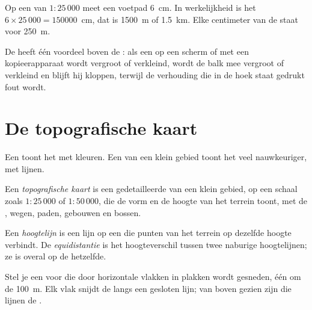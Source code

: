 \begin{example}
Op een  van $1 : 25\,000$ meet een voetpad \qty{6}{cm}. In
werkelijkheid is het $6 \times 25\,000 = \num{150000}$~cm, dat is \qty{1500}{m} of
\qty{1.5}{km}. Elke centimeter van de  staat voor \qty{250}{m}.
\end{example}

De  heeft één voordeel boven de : als een  op een
scherm of met een kopieerapparaat wordt vergroot of verkleind, wordt de
balk mee vergroot of verkleind en blijft hij kloppen, terwijl de verhouding
die in de hoek staat gedrukt fout wordt.

\section{De topografische kaart}

Een  toont het  met kleuren. Een  van een
klein gebied toont het veel nauwkeuriger, met lijnen.

\begin{definition}\label{def:g9:maps-of-the-earth:topographic-map}
Een \emph{topografische kaart} is een
gedetailleerde  van een klein gebied, op een schaal zoals
$1 : 25\,000$ of $1 : 50\,000$, die de vorm en de hoogte van het terrein
toont, met de , wegen, paden, gebouwen en bossen.
\end{definition}

\begin{definition}\label{def:g9:maps-of-the-earth:contour}
Een \emph{hoogtelijn} is een lijn op een  die punten
van het terrein op dezelfde hoogte verbindt. De
\emph{equidistantie} is het hoogteverschil tussen twee
naburige hoogtelijnen; ze is overal op de  hetzelfde.
\end{definition}

Stel je een  voor die door horizontale vlakken in plakken wordt
gesneden, één om de \qty{100}{m}. Elk vlak snijdt de  langs een
gesloten lijn; van boven gezien zijn die lijnen de .

